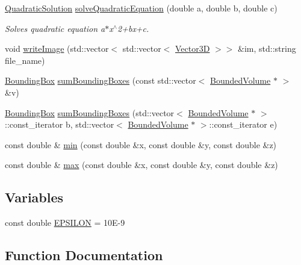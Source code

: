 \begin{DoxyCompactItemize}
\item 
\hyperlink{structutility_1_1QuadraticSolution}{Quadratic\+Solution} \hyperlink{namespaceutility_a8b46b751269001ecbf33625ccdacfdfa}{solve\+Quadratic\+Equation} (double a, double b, double c)
\begin{DoxyCompactList}\small\item\em Solves quadratic equation a$\ast$x$^\wedge$2+bx+c. \end{DoxyCompactList}\item 
void \hyperlink{namespaceutility_a34be8140338c47d4f6547c1093a0d772}{write\+Image} (std\+::vector$<$ std\+::vector$<$ \hyperlink{classVector3D}{Vector3D} $>$$>$ \&im, std\+::string file\+\_\+name)
\item 
\hyperlink{classBoundingBox}{Bounding\+Box} \hyperlink{namespaceutility_ab2fd278d0cec1254250c5dc3dc3edc64}{sum\+Bounding\+Boxes} (const std\+::vector$<$ \hyperlink{classBoundedVolume}{Bounded\+Volume} $\ast$ $>$ \&v)
\item 
\hyperlink{classBoundingBox}{Bounding\+Box} \hyperlink{namespaceutility_a97d2cabbc342d0ed91c63fedd698a1af}{sum\+Bounding\+Boxes} (std\+::vector$<$ \hyperlink{classBoundedVolume}{Bounded\+Volume} $\ast$ $>$\+::const\+\_\+iterator b, std\+::vector$<$ \hyperlink{classBoundedVolume}{Bounded\+Volume} $\ast$ $>$\+::const\+\_\+iterator e)
\item 
const double \& \hyperlink{namespaceutility_a54a16aa114a439cc9b6bbf37853fbedb}{min} (const double \&x, const double \&y, const double \&z)
\item 
const double \& \hyperlink{namespaceutility_adb70851ce3cf7edecde8490bd7f5c314}{max} (const double \&x, const double \&y, const double \&z)
\end{DoxyCompactItemize}
\subsection*{Variables}
\begin{DoxyCompactItemize}
\item 
const double \hyperlink{namespaceutility_a5726adf0a326e6887e05b0f485e14fde}{E\+P\+S\+I\+L\+ON} = 10\+E-\/9
\end{DoxyCompactItemize}


\subsection{Function Documentation}
